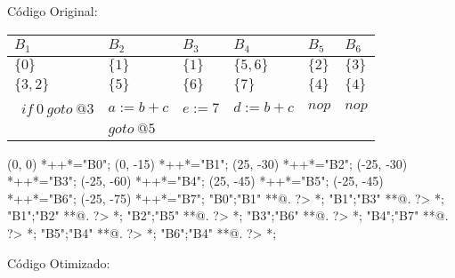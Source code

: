 C\'odigo Original:

\begin{table}[ht]
\begin{scriptsize}
\begin{tabular}{l|l|l|l|l|l}
$B_{1}$ & $B_{2}$ & $B_{3}$ & $B_{4}$ & $B_{5}$ & $B_{6}$ \\
\hline
$\{0\}$ & $\{1\}$ & $\{1\}$ & $\{5, 6\}$ & $\{2\}$ & $\{3\}$ \\
$\{3, 2\}$ & $\{5\}$ & $\{6\}$ & $\{7\}$ & $\{4\}$ & $\{4\}$ \\
\hline\
$if\:0\:goto\:@3$ & $a:=b+c$ & $e:=7$ & $d:=b+c$ & $nop$ & $nop$ \\
 & $goto\:@5$ &  &  &  &  \\
\end{tabular}
\end{scriptsize}
\end{table}

\begin{scriptsize}
\xy(0, 0)
	*++{}*\frm{-,}="B0";
(0, -15)
	*++{}*\frm{-,}="B1";
(25, -30)
	*++{}*\frm{-,}="B2";
(-25, -30)
	*++{}*\frm{-,}="B3";
(-25, -60)
	*++{}*\frm{-,}="B4";
(25, -45)
	*++{}*\frm{-,}="B5";
(-25, -45)
	*++{}*\frm{-,}="B6";
(-25, -75)
	*++{}*\frm{-,}="B7";
"B0";"B1" **@{.} ?> *{\dir{>}};
"B1";"B3" **@{.} ?> *{\dir{>}};
"B1";"B2" **@{.} ?> *{\dir{>}};
"B2";"B5" **@{.} ?> *{\dir{>}};
"B3";"B6" **@{.} ?> *{\dir{>}};
"B4";"B7" **@{.} ?> *{\dir{>}};
"B5";"B4" **@{.} ?> *{\dir{>}};
"B6";"B4" **@{.} ?> *{\dir{>}};
\endxy
\end{scriptsize}


C\'odigo Otimizado:

